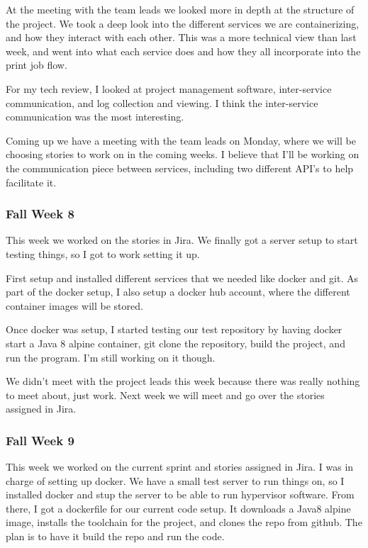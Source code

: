\documentclass[onecolumn, draftclsnofoot,10pt, compsoc]{IEEEtran}
\begin{document}
At the meeting with the team leads we looked more in depth at the structure of the project.
We took a deep look into the different services we are containerizing, and how they interact with each other.
This was a more technical view than last week, and went into what each service does and how they all incorporate into the print job flow.

For my tech review, I looked at project management software, inter-service communication, and log collection and viewing.  
I think the inter-service communication was the most interesting.

Coming up we have a meeting with the team leads on Monday, where we will be choosing stories to work on in the coming weeks. 
I believe that I'll be working on the communication piece between services, including two different API's to help facilitate it.

\subsubsection*{Fall Week 8}
This week we worked on the stories in Jira.
We finally got a server setup to start testing things, so I got to work setting it up.

First setup and installed different services that we needed like docker and git. As part of the docker setup, I also setup a docker hub account, where the different container images will be stored.

Once docker was setup, I started testing our test repository by having docker start a Java 8 alpine container, git clone the repository, build the project, and run the program.
I'm still working on it though.

We didn't meet with the project leads this week because there was really nothing to meet about, just work.
Next week we will meet and go over the stories assigned in Jira.

\subsubsection*{Fall Week 9}
This week we worked on the current sprint and stories assigned in Jira.
I was in charge of setting up docker.
We have a small test server to run things on, so I installed docker and stup the server to be able to run hypervisor software.
From there, I got a dockerfile for our current code setup.
It downloads a Java8 alpine image, installs the toolchain for the project, and clones the repo from github.
The plan is to have it build the repo and run the code. 
\end{document}
